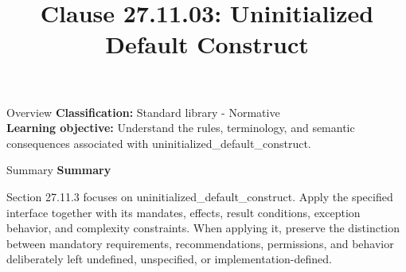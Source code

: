 \documentclass[10pt,letterpaper]{article}
\title{Clause 27.11.03: Uninitialized Default Construct}
\author{}
\date{}
\begin{document}
\maketitle
\begin{CornellOverviewBox}{Overview}
\textbf{Classification:} Standard library - Normative\\[2pt]
\textbf{Learning objective:} Understand the rules, terminology, and semantic consequences associated with uninitialized\_default\_construct.
\end{CornellOverviewBox}\begin{CornellSummaryBox}{Summary}
{\sffamily\bfseries\color{Accent} Summary}\par\vspace{3pt}Section 27.11.3 focuses on uninitialized\_default\_construct. Apply the specified interface together with its mandates, effects, result conditions, exception behavior, and complexity constraints. When applying it, preserve the distinction between mandatory requirements, recommendations, permissions, and behavior deliberately left undefined, unspecified, or implementation-defined.
\end{CornellSummaryBox}
\end{document}
